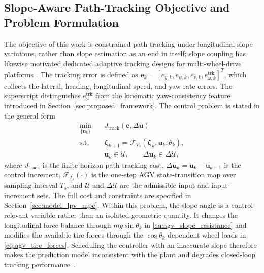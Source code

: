 \documentclass{ieeeaccess}
\newcommand{\citep}[1]{\cite{#1}}
\begin{document}
\subsection{Slope-Aware Path-Tracking Objective and Problem Formulation}

The objective of this work is constrained path tracking under longitudinal
slope variations, rather than slope estimation as an end in itself; slope coupling has likewise motivated dedicated adaptive tracking designs for multi-wheel-drive platforms \citep{Zhang2025CoupledSlope4WID}. The
tracking error is defined as
$\bm e_k=[e_{y,k},e_{\psi,k},e_{v,k},e_{\omega,k}^{\mathrm{trk}}]^{T}$, which
collects the lateral, heading, longitudinal-speed, and yaw-rate errors. The
superscript distinguishes $e_{\omega}^{\mathrm{trk}}$ from the kinematic
yaw-consistency feature introduced in
Section~\ref{sec:proposed_framework}. The control problem is stated in the
general form
\begin{equation}
\begin{aligned}
\min_{\{\bm u_k\}}\quad &J_{\mathrm{track}}(\bm e,\Delta\bm u)\\
\mathrm{s.t.}\quad
&\bm\zeta_{k+1}=\mathcal F_{T_s}(\bm\zeta_k,\bm u_k,\theta_k),\\
&\bm u_k\in\mathcal U,\qquad
\Delta\bm u_k\in\Delta\mathcal U,
\end{aligned}
\label{eq:slope_aware_tracking_objective}
\end{equation}
where $J_{\mathrm{track}}$ is the finite-horizon path-tracking cost,
$\Delta\bm u_k=\bm u_k-\bm u_{k-1}$ is the control increment,
$\mathcal F_{T_s}(\cdot)$ is the one-step AGV state-transition map over
sampling interval $T_s$, and $\mathcal U$ and $\Delta\mathcal U$ are the
admissible input and input-increment sets. The full cost and constraints are
specified in Section~\ref{sec:model_lpv_mpc}. Within
this problem, the slope angle is a control-relevant variable rather than an
isolated geometric quantity. It changes the longitudinal force balance
through $mg\sin\theta_k$ in \eqref{eq:agv_slope_resistance} and modifies the
available tire forces through the $\cos\theta_k$-dependent wheel loads in
\eqref{eq:agv_tire_forces}. Scheduling the controller with an inaccurate
slope therefore makes the prediction model inconsistent with the plant and
degrades closed-loop tracking
performance~\citep{Sato2013InexactScheduling,Metzler2021PredictionFidelity}.
\end{document}
